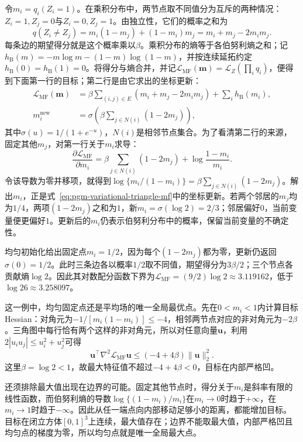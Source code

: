 令$m_i=q_i(Z_i=1)$。在乘积分布中，两节点取不同值分为互斥的两种情况：$Z_i=1,Z_j=0$与$Z_i=0,Z_j=1$。由独立性，它们的概率之和为
\[
  q(Z_i\ne Z_j)
    =m_i(1-m_j)+(1-m_i)m_j
    =m_i+m_j-2m_im_j.
\]
每条边的期望得分就是这个概率乘以$\beta$。乘积分布的熵等于各伯努利熵之和；记$h_{\mathrm B}(m)=-m\log m-(1-m)\log(1-m)$，并按连续延拓约定$h_{\mathrm B}(0)=h_{\mathrm B}(1)=0$。将得分与熵合并，并记$\mathcal L_{\mathrm{MF}}(\bm m)=\mathcal L_Z(\prod_iq_i)$，便得到下面第一行的目标；第二行是由它求出的坐标更新：
\begin{equation}
  \begin{aligned}
    \mathcal L_{\mathrm{MF}}(\bm m)
      &=\beta\sum_{(i,j)\in E}
           (m_i+m_j-2m_im_j)+\sum_i h_{\mathrm B}(m_i),\\
    m_i^{\mathrm{new}}
      &=\sigma\left(\beta\sum_{j\in N(i)}(1-2m_j)\right),
  \end{aligned}
  \label{eq:pgm-variational-triangle-mf}
\end{equation}
其中$\sigma(u)=1/(1+e^{-u})$，$N(i)$是相邻节点集合。为了看清第二行的来源，固定其他$m_j$，对第一行关于$m_i$求导：
\[
  \frac{\partial\mathcal L_{\mathrm{MF}}}{\partial m_i}
    =\beta\sum_{j\in N(i)}(1-2m_j)
       +\log\frac{1-m_i}{m_i}.
\]
令该导数为零并移项，就得到$\log\{m_i/(1-m_i)\}=\beta\sum_{j\in N(i)}(1-2m_j)$。解出$m_i$，正是式~\eqref{eq:pgm-variational-triangle-mf}中的坐标更新。若两个邻居的$m_j$均为$1/4$，两项$(1-2m_j)$之和为$1$，新$m_i=\sigma(\log2)=2/3$；邻居偏好$0$，当前变量便更偏好$1$。更新后的$m_i$仍表示伯努利分布中的概率，保留当前变量的不确定性。

均匀初始化给出固定点$m_i=1/2$，因为每个$(1-2m_j)$都为零，更新仍返回$\sigma(0)=1/2$。此时三条边各以概率$1/2$取不同值，期望得分为$3\beta/2$；三个节点各贡献熵$\log2$。因此其对数配分函数下界为$\mathcal L_{\mathrm{MF}}=(9/2)\log2\approx3.119162$，低于$\log26\approx3.258097$。

这一例中，均匀固定点还是平均场的唯一全局最优点。先在$0<m_i<1$内计算目标Hessian：对角元为$-1/[m_i(1-m_i)]\leq-4$，相邻两节点对应的非对角元为$-2\beta$。三角图中每行恰有两个这样的非对角元，所以对任意向量$\bm u$，利用$2|u_i u_j|\leq u_i^2+u_j^2$可得
\[
  \bm u^\top\nabla^2\mathcal L_{\mathrm{MF}}\bm u
    \leq(-4+4\beta)\lVert\bm u\rVert_2^2.
\]
这里$\beta=\log2<1$，故最大特征值不超过$-4+4\beta<0$，目标在内部严格凹。

还须排除最大值出现在边界的可能。固定其他节点时，得分关于$m_i$是斜率有限的线性函数，而伯努利熵的导数$\log\{(1-m_i)/m_i\}$在$m_i\to0$时趋于$+\infty$，在$m_i\to1$时趋于$-\infty$。因此从任一端点向内部移动足够小的距离，都能增加目标。目标在闭立方体$[0,1]^3$上连续，最大值存在；边界不能取最大值，内部严格凹且均匀点的梯度为零，所以均匀点就是唯一全局最大点。

